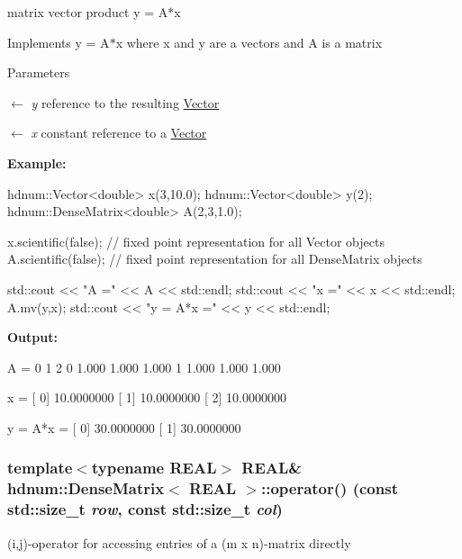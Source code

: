 matrix vector product y = A$\ast$x 

Implements y = A$\ast$x where x and y are a vectors and A is a matrix


\begin{DoxyParams}{Parameters}
\item[\mbox{$\leftarrow$} {\em y}]reference to the resulting \hyperlink{classhdnum_1_1Vector}{Vector} \item[\mbox{$\leftarrow$} {\em x}]constant reference to a \hyperlink{classhdnum_1_1Vector}{Vector}\end{DoxyParams}
{\bfseries Example:} 
\begin{DoxyCode}
  hdnum::Vector<double> x(3,10.0);
  hdnum::Vector<double> y(2);
  hdnum::DenseMatrix<double> A(2,3,1.0);

  x.scientific(false); // fixed point representation for all Vector objects
  A.scientific(false); // fixed point representation for all DenseMatrix objects

  std::cout << "A =" << A << std::endl;
  std::cout << "x =" << x << std::endl;
  A.mv(y,x);
  std::cout << "y = A*x =" << y << std::endl;
\end{DoxyCode}


{\bfseries Output:} \begin{DoxyVerb}
A =
                      0          1          2 
          0       1.000      1.000      1.000 
          1       1.000      1.000      1.000 

x =
[ 0]     10.0000000
[ 1]     10.0000000
[ 2]     10.0000000

y = A*x =
[ 0]     30.0000000
[ 1]     30.0000000
	  \end{DoxyVerb}
 \hypertarget{classhdnum_1_1DenseMatrix_aaaedd0bde6bff8e04a0df7ef2afccbf5}{
\subsubsection[{operator()}]{\setlength{\rightskip}{0pt plus 5cm}template$<$typename REAL$>$ REAL\& {\bf hdnum::DenseMatrix}$<$ REAL $>$::operator() (const std::size\_\-t {\em row}, \/  const std::size\_\-t {\em col})}}
\label{classhdnum_1_1DenseMatrix_aaaedd0bde6bff8e04a0df7ef2afccbf5}


(i,j)-\/operator for accessing entries of a (m x n)-\/matrix directly 


